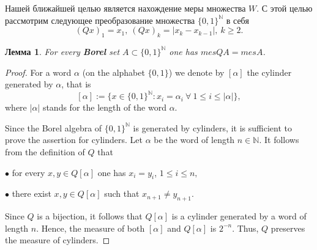 \documentclass[12pt]{article}
\newtheorem{lem}[thm]{Лемма}
\def\N{{\mathbb{N}}}
\begin{document}
Нашей ближайшей целью является нахождение меры множества $W$. С этой целью рассмотрим следующее преобразование множества $\{0,1\}^\N$ в себя
$$(Qx)_1=x_1, \ (Qx)_k=|x_k-x_{k-1}|, \ k\ge2.$$

\begin{lem}\label{Q}
For every \textbf{Borel} set $A\subset \{0,1\}^\N$ one has $mes QA = mes A$.
\end{lem}

\begin{proof}
For a word $\alpha$ (on the alphabet $\{0,1\}$) we denote by $[\alpha]$ the cylinder generated by $\alpha$, that is
$$[\alpha]:= \{ x\in \{0,1\}^\N : x_i=\alpha_i \ \forall \ 1\le i \le |\alpha|\},$$
where $|\alpha|$ stands for the length of the word $\alpha$.

Since the Borel algebra of $\{0,1\}^\N$ is generated by cylinders, it is sufficient to prove the assertion for cylinders. Let $\alpha$ be the word of length $n\in \N$. It follows from the definition of $Q$ that

$\bullet$ for every $x,y \in Q[\alpha]$ one has $x_i = y_i$, $1\le i \le n,$

$\bullet$ there exist $x,y \in Q[\alpha]$ such that $x_{n+1} \neq y_{n+1}$.

Since $Q$ is a bijection, it follows that $Q[\alpha]$ is a cylinder generated by a word of length $n$. Hence, the measure of both $[\alpha]$ and $Q[\alpha]$ is $2^{-n}$. Thus, $Q$ preserves the measure of cylinders.
\end{proof}

%
\end{document}
